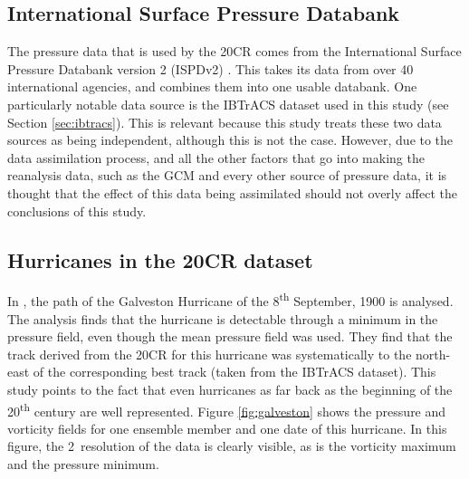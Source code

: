 \documentclass[pdftex,12pt,a4paper]{report}
\newcommand{\ts}{\textsuperscript}
\begin{document}
\subsection{International Surface Pressure Databank}
\label{sec:ispd}
The pressure data that is used by the 20CR comes from the International Surface Pressure Databank
version 2 (ISPDv2) \parencite{yin2008international}. This takes its data from over 40 international
agencies, and combines them into one usable databank. One particularly notable data source is the
IBTrACS dataset used in this study (see Section \ref{sec:ibtracs}). This is relevant because this
study treats these two data sources as being independent, although this is not the case. However,
due to the data assimilation process, and all the other factors that go into making the reanalysis
data, such as the GCM and every other source of pressure data, it is thought that the effect of this
data being assimilated should not overly affect the conclusions of this study. 



\subsection{Hurricanes in the 20CR dataset}

In \textcite{neff2013analysis}, the path of the Galveston Hurricane of the 8\ts{th} September, 1900
is analysed. The analysis finds that the hurricane is detectable through a minimum in the pressure
field, even though the mean pressure field was used. They find that the track derived from the 20CR
for this hurricane was systematically to the north-east of the corresponding best track (taken from
the IBTrACS dataset). This study points to the fact that even hurricanes as far back as the
beginning of the 20\ts{th} century are well represented. Figure \ref{fig:galveston} shows the
pressure and vorticity fields for one ensemble member and one date of this hurricane. In this
figure, the 2\textdegree\ resolution of the data is clearly visible, as is the vorticity maximum and
the pressure minimum.
\end{document}
